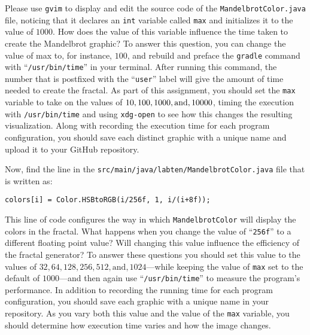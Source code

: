 \documentclass[11pt]{article}
\newcommand{\secondprogram}{\lstinline{MandelbrotColor}}
\newcommand{\secondprogramsource}{\lstinline{src/main/java/labten/MandelbrotColor.java}}
\newcommand{\command}[1]{``\lstinline{#1}''}
\newcommand{\program}[1]{\lstinline{#1}}
\begin{document}
Please use {\tt gvim} to display and edit the source code of the {\tt MandelbrotColor.java} file, noticing that it
declares an {\tt int} variable called {\tt max} and initializes it to the value of $1000$. How does the value of this
variable influence the time taken to create the Mandelbrot graphic? To answer this question, you can change the value of
max to, for instance, $100$, and rebuild and preface the \program{gradle} command with ``{\tt /usr/bin/time}'' in your
terminal. After running this command, the number that is postfixed with the ``{\tt user}'' label will give the amount of
time needed to create the fractal. As part of this assignment, you should set the {\tt max} variable to take on the
values of $10, 100, 1000, \mbox{and}, \- 10000$, timing the execution with {\tt /usr/bin/time} and using {\tt xdg-open}
to see how this changes the resulting visualization. Along with recording the execution time for each program
configuration, you should save each distinct graphic with a unique name and upload it to your GitHub repository.

\noindent
Now, find the line in the \secondprogramsource{} file that is written as:

\vspace*{.5em}
{\tt colors[i] = Color.HSBtoRGB(i/256f, 1, i/(i+8f));}
\vspace*{.5em}

\noindent This line of code configures the way in which \secondprogram{} will display the colors in the fractal. What
happens when you change the value of ``{\tt 256f}'' to a different floating point value? Will changing this value
influence the efficiency of the fractal generator? To answer these questions you should set this value to the values of
$32, 64, 128, 256, 512, \mbox{and}, 1024$---while keeping the value of {\tt max} set to the default of $1000$---and then
again use \command{/usr/bin/time} to measure the program's performance. In addition to recording the running time for
each program configuration, you should save each graphic with a unique name in your repository. As you vary both this
value and the value of the {\tt max} variable, you should determine how execution time varies and how the image changes.
\end{document}
